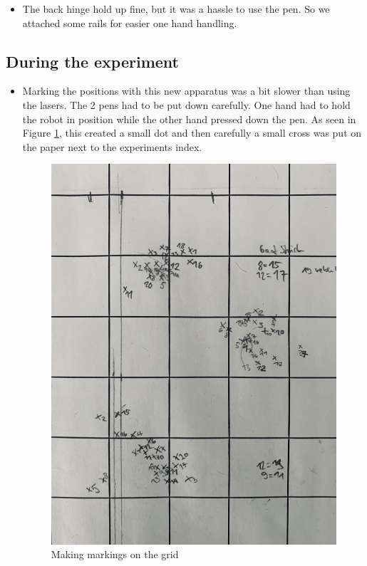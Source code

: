 \begin{itemize}
\begin{itemize}
                \item[4.] The back hinge hold up fine, but it was a hassle to use the pen. So we attached some rails for easier one hand handling.
            \end{itemize}
            
        \subsection{During the experiment}
        \begin{itemize}
            \item[1.] Marking the positions with this new apparatus was a bit slower than using the lasers. The 2 pens had to be put down carefully. One hand had to hold the robot in position while the other hand pressed down the pen. As seen in Figure \ref{fig:grid marking}, this created a small dot and then carefully a small cross was put on the paper next to the experiments index. 
            
            \begin{figure}[!ht] 
                        \centering \includegraphics[scale=6.0]{"images/experiment_2/experiment.png"}
                        \caption{Making markings on the grid}
                        \label{fig:grid marking}
            \end{figure}
                 

\end{itemize}
\end{itemize}
